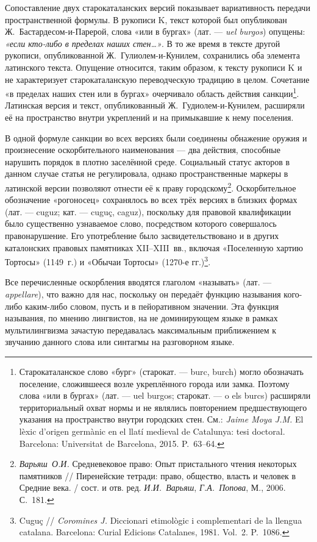Сопоставление двух старокаталанских версий показывает вариативность передачи пространственной формулы. В рукописи K, текст которой был опубликован Ж.~Бастардесом-и-Парерой, слова «или в бургах» (лат. --- \emph{uel burgos}) опущены: \emph{«если кто-либо в пределах наших стен…»}. В то же время в тексте другой рукописи, опубликованной Ж.~Гулиолем-и-Кунилем, сохранились оба элемента латинского текста. Опущение относится, таким образом, к тексту рукописи K и не характеризует старокаталанскую переводческую традицию в целом. Сочетание «в пределах наших стен или в бургах» очерчивало область действия санкции\footnote{Старокаталанское слово «бург» (старокат. --- burc, burch) могло обозначать поселение, сложившееся возле укреплённого города или замка. Поэтому слова «или в бургах» (лат. --- uel burgos; старокат. --- o els burcs) расширяли территориальный охват нормы и не являлись повторением предшествующего указания на пространство внутри городских стен. См.: \emph{Jaime Moya J.M. }El lèxic d’origen germànic en el llatí medieval de Catalunya: tesi doctoral. Barcelona: Universitat de Barcelona, 2015. P.~63--64.}. Латинская версия и текст, опубликованный Ж.~Гудиолем-и-Кунилем, расширяли её на пространство внутри укреплений и на примыкавшие к нему поселения.

В одной формуле санкции во всех версиях были соединены обнажение оружия и произнесение оскорбительного наименования --- два действия, способные нарушить порядок в плотно заселённой среде. Социальный статус акторов в данном случае статья не регулировала, однако пространственные маркеры в латинской версии позволяют отнести её к праву городскому\footnote{\emph{Варьяш~О.И.} Средневековое право: Опыт пристального чтения некоторых памятников // Пиренейские тетради: право, общество, власть и человек в Средние века. / сост. и отв. ред. \emph{И.И.~Варьяш}, \emph{Г.А.~Попова}, М., 2006. С.~181.}. Оскорбительное обозначение «рогоносец» сохранялось во всех трёх версиях в близких формах (лат. --- cuguz; кат. --- cuguç, caguz), поскольку для правовой квалификации было существенно узнаваемое слово, посредством которого совершалось правонарушение. Его употребление было засвидетельствовано и в других каталонских правовых памятниках XII--XIII~вв., включая «Поселенную хартию Тортосы» (1149~г.) и «Обычаи Тортосы» (1270-е гг.)\footnote{Cuguç // \emph{Coromines J. }Diccionari etimològic i complementari de la llengua catalana. Barcelona: Curial Edicions Catalanes, 1981. Vol.~2. P.~1086.}.

Все перечисленные оскорбления вводятся глаголом «называть» (лат. --- \emph{appellare}), что важно для нас, поскольку он передаёт функцию называния кого-либо каким-либо словом, пусть и в пейоративном значении. Эта функция называния, по мнению лингвистов, на не доминирующем языке в рамках мультилингвизма зачастую передавалась максимальным приближением к звучанию данного слова или синтагмы на разговорном языке.

